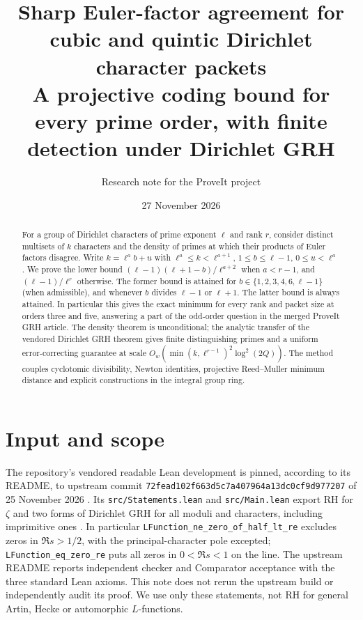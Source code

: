 \documentclass[11pt]{article}
\title{Sharp Euler-factor agreement for cubic and quintic Dirichlet character packets\\[3pt]\large A projective coding bound for every prime order, with finite detection under Dirichlet GRH}
\author{Research note for the ProveIt project}
\date{27 November 2026}
\theoremstyle{remark}\newtheorem{remark}[theorem]{Remark}
\begin{document}
\maketitle
\begin{abstract}
For a group of Dirichlet characters of prime exponent $\ell$ and rank $r$, consider distinct multisets of $k$ characters and the density of primes at which their products of Euler factors disagree. Write $k=\ell^a b+u$ with $\ell^a\le k<\ell^{a+1}$, $1\le b\le\ell-1$, $0\le u<\ell^a$. We prove the lower bound $(\ell-1)(\ell+1-b)/\ell^{a+2}$ when $a<r-1$, and $(\ell-1)/\ell^r$ otherwise. The former bound is attained for $b\in\{1,2,3,4,6,\ell-1\}$ (when admissible), and whenever $b$ divides $\ell-1$ or $\ell+1$. The latter bound is always attained. In particular this gives the exact minimum for every rank and packet size at orders three and five, answering a part of the odd-order question in the merged ProveIt GRH article. The density theorem is unconditional; the analytic transfer of the vendored Dirichlet GRH theorem gives finite distinguishing primes and a uniform error-correcting guarantee at scale $O_w(\min(k,\ell^{r-1})^2\log^2(2Q))$. The method couples cyclotomic divisibility, Newton identities, projective Reed--Muller minimum distance and explicit constructions in the integral group ring.
\end{abstract}

\section{Input and scope}
The repository's vendored readable Lean development is pinned, according to its README, to upstream commit \texttt{72fead102f663d5c7a407}\allowbreak\texttt{964a13dc0cf9d977207} of 25 November 2026 \cite{vendor}. Its \texttt{src/Statements.lean} and \texttt{src/Main.lean} export RH for $\zeta$ and two forms of Dirichlet GRH for all moduli and characters, including imprimitive ones \cite{statements,main}. In particular \texttt{LFunction\_ne\_zero\_of\_}\allowbreak\texttt{half\_lt\_re} excludes zeros in $\Re s>1/2$, with the principal-character pole excepted; \texttt{LFunction\_eq\_zero\_re} puts all zeros in $0<\Re s<1$ on the line. The upstream README reports independent checker and Comparator acceptance with the three standard Lean axioms. This note does not rerun the upstream build or independently audit its proof. We use only these statements, not RH for general Artin, Hecke or automorphic $L$-functions.
\end{document}

